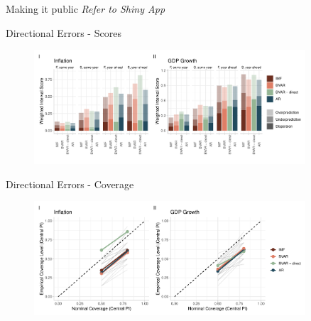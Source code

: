 \documentclass[en]{sdqbeamer}
\begin{document}
\begin{frame}{Making it public}
\textit{Refer to Shiny App}    
\end{frame}




\appendix
\beginbackup
\begin{frame}{Directional Errors - Scores}
\label{errorextraction}
\begin{figure}
        \centering
        \includegraphics[width=0.9\textwidth]{figures/wis_cpigdp_new_directional.pdf}
    \end{figure}
\end{frame}
\begin{frame}{Directional Errors - Coverage}
\begin{figure}
        \centering
        \includegraphics[width=0.9\textwidth]{figures/coverage_directional.pdf}
    \end{figure}
\end{frame}
\end{document}
